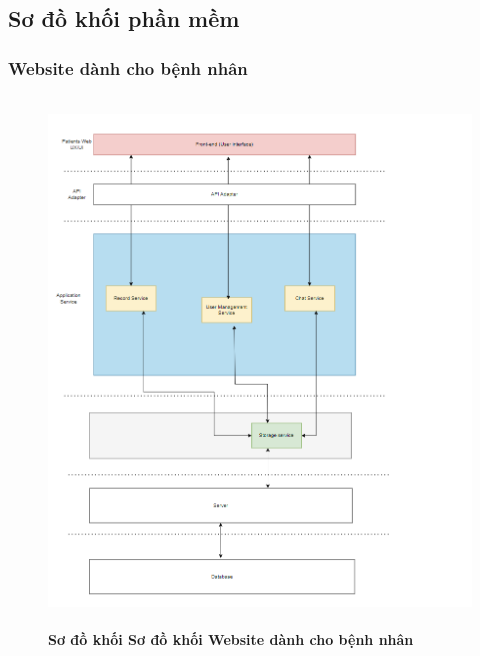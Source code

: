 \subsection{Sơ đồ khối phần mềm}

\subsubsection{Website dành cho bệnh nhân}
\mbox{}

\begin{figure}[H]
  \centering
  \includegraphics[width=12cm,height=14cm]{Images/system/fmECG_architecture-Patient.drawio.png}
  \caption[Sơ đồ khối Website dành cho bệnh nhân]{\bfseries \fontsize{12pt}{0pt}\selectfont Sơ đồ khối Sơ đồ khối Website dành cho bệnh nhân}
  \label{fmECG_architecture-Patient} %
\end{figure}

